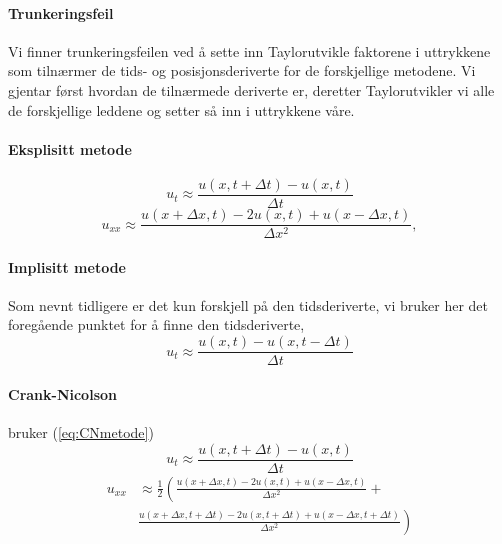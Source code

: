 \documentclass[norsk, 10pt]{article}
\begin{document}
\paragraph{Trunkeringsfeil}
Vi finner trunkeringsfeilen ved å sette inn Taylorutvikle faktorene i uttrykkene som tilnærmer de tids- og posisjonsderiverte for de forskjellige metodene. Vi gjentar først hvordan de tilnærmede deriverte er, deretter Taylorutvikler vi alle de forskjellige leddene og setter så inn i uttrykkene våre.
\paragraph{Eksplisitt metode}
\begin{equation}
u_t\approx \frac{u(x,t+\Delta t)-u(x,t)}{\Delta t}\label{eq:tideksplisitt}
\end{equation}
\begin{equation}
u_{xx}\approx \frac{u(x+\Delta x,t)-2u(x,t)+u(x-\Delta x,t)}{\Delta x^2}, \label{eq:xeksplisitt}
\end{equation}

\paragraph{Implisitt metode}
Som nevnt tidligere er det kun forskjell på den tidsderiverte, vi bruker her det foregående punktet for å finne den tidsderiverte,
\begin{equation}
u_t\approx \frac{u(x,t)-u(x,t-\Delta t)}{\Delta t} \label{eq:implisitt}
\end{equation}
\paragraph{Crank-Nicolson} bruker (\ref{eq:CNmetode})
\begin{equation}
u_t\approx \frac{u(x,t+\Delta t)-u(x,t)}{\Delta t}
\end{equation}
\begin{align}
u_{xx}&\approx \frac{1}{2}\left(\frac{u(x+\Delta x,t)-2u(x,t)+u(x-\Delta x,t)}{\Delta x^2}+\right. \nonumber\\
&\left. \frac{u(x+\Delta x,t+\Delta t)-2u(x,t+\Delta t)+u(x-\Delta x,t+\Delta t)}{\Delta x^2} \right)  \label{eq:crank}
\end{align}
\end{document}
